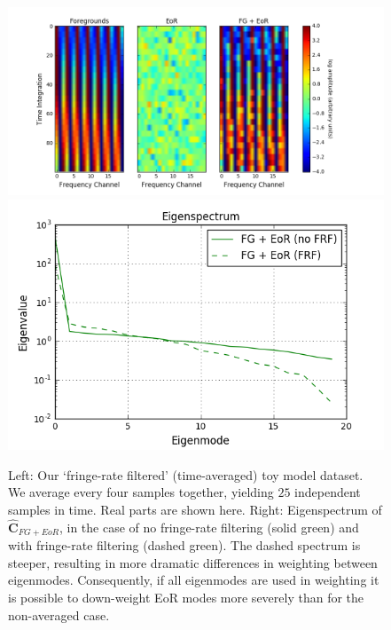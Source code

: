\documentclass[preprint2,numberedappendix,tighten]{aastex6}  %
\begin{document}
\begin{figure}
	\centering
	\includegraphics[trim={1.5cm 0.2cm 1.5cm 0.3cm},clip,height=0.29\textwidth]{plots/toy_sigloss5.png}
	\includegraphics[trim={0.3cm 0.2cm 0.3cm 0.3cm},clip,height=0.29\textwidth]{plots/toy_sigloss15.png}
	\caption{Left: Our `fringe-rate filtered' (time-averaged) toy model dataset. We average every four samples together, yielding $25$ independent samples in time. Real parts are shown here. Right: Eigenspectrum of $\hat{\textbf{C}}_{FG+EoR}$, in the case of no fringe-rate filtering (solid green) and with fringe-rate filtering (dashed green). The dashed spectrum is steeper, resulting in more dramatic differences in weighting between eigenmodes. Consequently, if all eigenmodes are used in weighting it is possible to down-weight EoR modes more severely than for the non-averaged case.}
	\label{fig:toy_sigloss5}
\end{figure}
\end{document}
